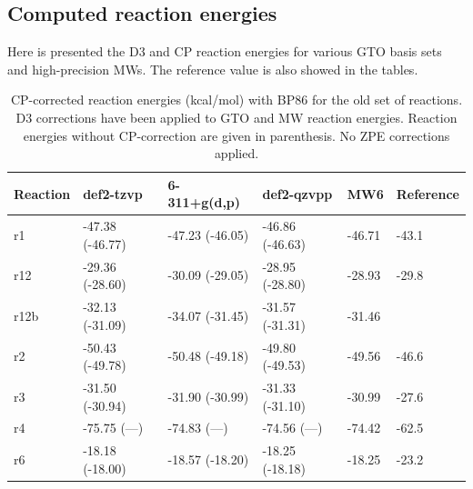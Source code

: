 \documentclass[11pt,a4paper]{article}
\begin{document}
	\subsection{Computed reaction energies}
	Here is presented the D3 and CP reaction energies for various GTO basis sets and high-precision MWs. The reference value\parencite{dohm2018} is also showed in the tables.
	
	\begin{table}[H]
		\centering
		\label{tab: rxn energies old bp86}
		\caption{CP-corrected reaction energies (\si{kcal/mol}) with BP86 for the old set of reactions. D3 corrections have been applied to GTO and MW reaction energies. Reaction energies without CP-correction are given in parenthesis. No ZPE corrections applied.}
		\begin{tabular}{l l l l l l }
			\toprule
			Reaction & def2-tzvp       & 6-311+g(d,p)    & def2-qzvpp      & MW6    & Reference \parencite{dohm2018} \\ \midrule
			r1       & -47.38 (-46.77) & -47.23 (-46.05) & -46.86 (-46.63) & -46.71 & -43.1                          \\
			r12      & -29.36 (-28.60) & -30.09 (-29.05) & -28.95 (-28.80) & -28.93 & -29.8                          \\
			r12b     & -32.13 (-31.09) & -34.07 (-31.45) & -31.57 (-31.31) & -31.46 &                                \\
			r2       & -50.43 (-49.78) & -50.48 (-49.18) & -49.80 (-49.53) & -49.56 & -46.6                          \\
			r3       & -31.50 (-30.94) & -31.90 (-30.99) & -31.33 (-31.10) & -30.99 & -27.6                          \\
			r4       & -75.75 (---)    & -74.83 (---)    & -74.56 (---)    & -74.42 & -62.5                          \\
			r6       & -18.18 (-18.00) & -18.57 (-18.20) & -18.25 (-18.18) & -18.25 & -23.2                          \\ \bottomrule
		\end{tabular}
	\end{table}
\end{document}
